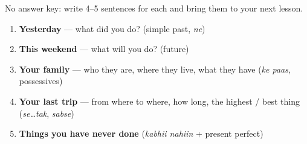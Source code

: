 No answer key: write 4--5 sentences for each and bring them to your next lesson.

\begin{enumerate}
  \item \textbf{Yesterday} — what did you do? (simple past, \textit{ne})
  \item \textbf{This weekend} — what will you do? (future)
  \item \textbf{Your family} — who they are, where they live, what they have (\textit{ke paas}, possessives)
  \item \textbf{Your last trip} — from where to where, how long, the highest / best thing (\textit{se\ldots tak}, \textit{sabse})
  \item \textbf{Things you have never done} (\textit{kabhii nahiin} + present perfect)
\end{enumerate}
